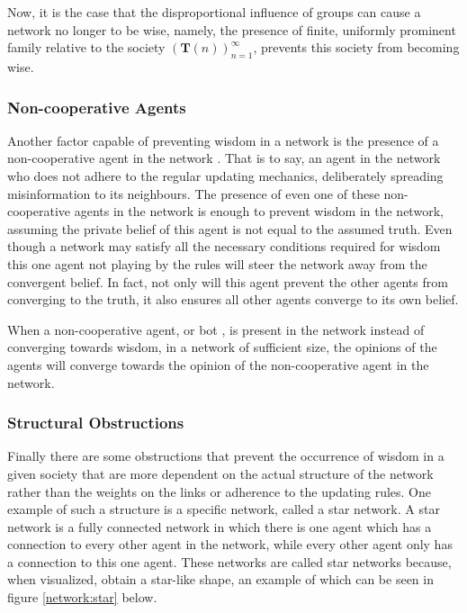 \documentclass{article}
\newcommand{\T}{\textbf{T}}
\newcommand{\Soc}{(\T(n))^{\infty}_{n=1}}
\begin{document}
Now, it is the case that the disproportional influence of groups can cause a network no longer to be wise, namely, the presence of finite, uniformly prominent family relative to the society $\Soc$, prevents this society from becoming wise.

\subsubsection{Non-cooperative Agents}

Another factor capable of preventing wisdom in a network is the presence of a non-cooperative agent in the network \cite{amir2021robust}. That is to say, an agent in the network who does not adhere to the regular updating mechanics, deliberately spreading misinformation to its neighbours. The presence of even one of these non-cooperative agents in  the network is enough to prevent wisdom in the network, assuming the private belief of this agent is not equal to the assumed truth. Even though a network may satisfy all the necessary conditions required for wisdom this one agent not playing by the rules will steer the network away from the convergent belief. In fact, not only will this agent prevent the other agents from converging to the truth, it also ensures all other agents converge to its own belief.


When a non-cooperative agent, or bot \cite{amir2021robust}, is present in the network instead of converging towards wisdom, in a network of sufficient size, the opinions of the agents will converge towards the opinion of the non-cooperative agent in the network. 

\subsubsection{Structural Obstructions}

Finally there are some obstructions that prevent the occurrence of wisdom in a given society that are more dependent on the actual structure of the network rather than the weights on the links or adherence to the updating rules. One example of such a structure is a specific network, called a star network. A star network is a fully connected network in which there is one agent which has a connection to every other agent in the network, while every other agent only has a connection to this one agent. These networks are called star networks because, when visualized, obtain a star-like shape, an example of which can be seen in figure \ref{network:star} below.
\end{document}
